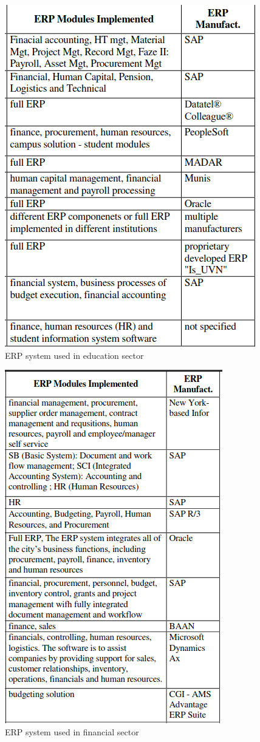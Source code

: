 \begin{figure}[H]
\centering
	\includegraphics[scale=0.5]{Chapter1/Figures/ERP1.png}	
	\caption{ERP system used in education sector}
	\label{fig:ERPEducation}
\end{figure}

\begin{figure}[H]
\centering
	\includegraphics[scale=0.5]{Chapter1/Figures/ERP2.png}	
	\caption{ERP system used in financial sector }
	\label{fig:ERPFinance}
\end{figure}


